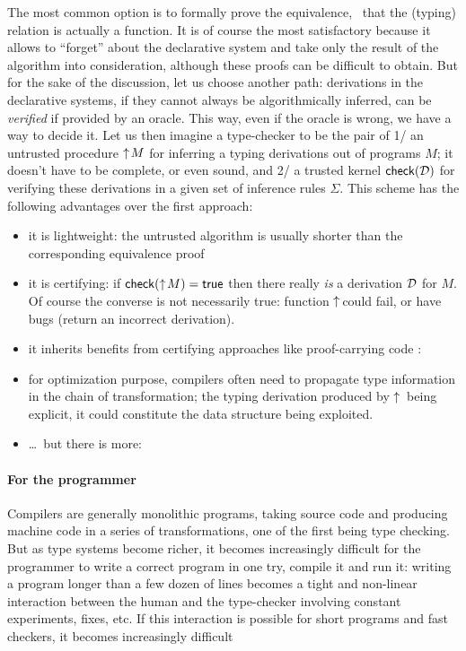 \documentclass[9pt]{sigplanconf}
\begin{document}
The most common option is to formally prove the equivalence, \ie\ that
the (typing) relation is actually a function. It is of course the most
satisfactory because it allows to ``forget'' about the declarative
system and take only the result of the algorithm into consideration,
although these proofs can be difficult to obtain. But for the sake of
the discussion, let us choose another path: derivations in the
declarative systems, if they cannot always be algorithmically
inferred, can be \emph{verified} if provided by an oracle. This way,
even if the oracle is wrong, we have a way to decide it. Let us then
imagine a type-checker to be the pair of 1/ an untrusted procedure
$\uparrow\!{M}$ for inferring a typing derivations out of programs $M$; it
doesn't have to be complete, or even sound, and 2/ a trusted kernel
${\text{\textsf{check}}}({\mathcal D})$ for verifying these derivations in a given set of
inference rules $\Sigma$. This scheme has the following advantages
over the first approach:
\begin{itemize}
\item it is lightweight: the untrusted algorithm is usually shorter
  than the corresponding equivalence proof
\item it is certifying: if ${\text{\textsf{check}}}({\uparrow\!{M}}) = \text{\textsf{true}}$ then
  there really \emph{is} a derivation $\mathcal D$ for $M$. Of course the
  converse is not necessarily true: function $\uparrow\!{}\!\!$ could
  fail, or have bugs (return an incorrect derivation).
\item it inherits benefits from certifying approaches like
  proof-carrying code \cite{necula1997proof}: %
\item for optimization purpose, compilers often need to propagate type
  information in the chain of transformation; the typing derivation
  produced by $\uparrow\!{}$ being explicit, it could constitute the data
  structure being exploited.
\item \ldots\ but there is more:
\end{itemize}

\paragraph{For the programmer}

Compilers are generally monolithic programs, taking source code and
producing machine code in a series of transformations, one of the
first being type checking. But as type systems become richer, it
becomes increasingly difficult for the programmer to write a correct
program in one try, compile it and run it: writing a program longer
than a few dozen of lines becomes a tight and non-linear interaction
between the human and the type-checker involving constant experiments,
fixes, etc. If this interaction is possible for short programs and
fast checkers, it becomes increasingly difficult %
\end{document}
